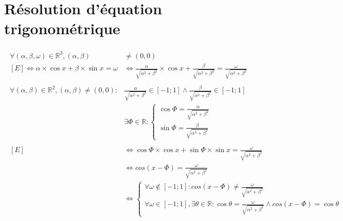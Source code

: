\documentclass[a4paper, 12pt]{article}
\begin{document}
	\section{Résolution d'équation trigonométrique}
	\begin{gather*}
		\begin{split}
			\forall \left( \alpha,\beta,\omega \right) \in\mathbb{R}^3, \left( \alpha,\beta \right) &\neq \left( 0,0 \right) \\
			\left[E\right]\Leftrightarrow\alpha\times\cos{x} + \beta\times\sin{x} = \omega &\Leftrightarrow \frac{\alpha}{\sqrt{\alpha^2+\beta^2}}\times\cos{x} + \frac{\beta}{\sqrt{\alpha^2+\beta^2}} = \frac{\omega}{\sqrt{\alpha^2+\beta^2}}\\
			\\
			\forall\left(\alpha,\beta\right)\in\mathbb{R}^2, \left(\alpha, \beta\right)\neq\left(0,0\right):&\frac{\alpha}{\sqrt{\alpha^2+\beta^2}}\in\left[-1; 1\right]\wedge\frac{\beta}{\sqrt{\alpha^2+\beta^2}}\in\left[-1; 1\right]\\
			&\exists\varPhi\in\mathbb{R}:
			\begin{cases}
				\cos{\varPhi} = \frac{\alpha}{\sqrt{\alpha^2+\beta^2}}\\
				\sin{\varPhi} = \frac{\beta}{\sqrt{\alpha^2+\beta^2}}
			\end{cases}\\
			\\
			\left[E\right]&\Leftrightarrow\cos{\varPhi}\times\cos{x} + \sin{\varPhi}\times\sin{x} = \frac{\omega}{\sqrt{\alpha^2+\beta^2}}\\
			&\Leftrightarrow cos\left(x-\varPhi\right) = \frac{\omega}{\sqrt{\alpha^2+\beta^2}}\\
			&\Leftrightarrow
			\begin{cases}
				\forall\omega\notin\left[-1; 1\right]: cos\left(x-\varPhi\right) \neq \frac{\omega}{\sqrt{\alpha^2+\beta^2}}\\
				\forall\omega\in\left[-1; 1\right], \exists\theta\in\mathbb{R}: \cos{\theta} = \frac{\omega}{\sqrt{\alpha^2+\beta^2}}\wedge cos\left(x-\varPhi\right) = \cos{\theta}
			\end{cases}
		\end{split}
	\end{gather*}
\end{document}
